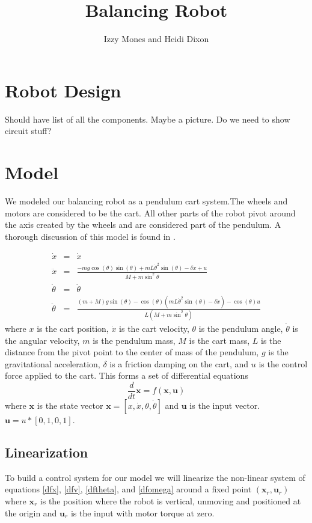 \documentclass[]{article}
\title{Balancing Robot}
\author{Izzy Mones and Heidi Dixon}
\newcommand{\bx}{\boldsymbol{x}}
\newcommand{\bu}{\boldsymbol{u}}
\begin{document}
	\maketitle

\section*{Robot Design}
Should have list of all the components. Maybe a picture. Do we need to show circuit stuff?

\section*{Model}
We modeled our balancing robot as a pendulum cart system.The wheels and motors are considered to be the cart.  All other parts of the robot pivot around the axis created by the wheels and are considered part of the pendulum.  A thorough discussion of this model is found in \cite{brunton}.

\begin{eqnarray}
	\dot{x} & = & \dot{x} \label{dfx} \\ 
	\ddot{x}          & = & \frac{-mg \cos(\theta)\sin(\theta) + mL{\dot{\theta}}^2 \sin(\theta)-\delta \dot{x}+u }{M+m\sin^2\theta}  \label{dfv} \\
	\dot{\theta}  &= & \dot{\theta} \label{dftheta} \\	
	\ddot{\theta}  &= & \frac{(m+M)g\sin(\theta)-\cos(\theta)(mL{\dot{\theta}}^2\sin(\theta)-\delta \dot{x})-\cos(\theta)u}{L(M+m\sin^2\theta)} \label{dfomega}
\end{eqnarray}
where $x$ is the cart position, $\dot{x}$ is the cart velocity, $\theta$ is the pendulum angle, $\dot{\theta}$ is the angular velocity, $m$ is the pendulum mass, $M$ is the cart mass, $L$ is the distance from the pivot point to the center of mass of the pendulum, $g$ is the gravitational acceleration, $\delta$ is a friction damping on the cart, and $u$ is the control force applied to the cart. This forms a set of differential equations 
\begin{equation}
	\frac{d}{dt} \bx = f(\bx, \bu) \label{dfdx}
\end{equation}
where $\bx$ is the state vector $\bx = [x, \dot{x}, \theta, \dot{\theta}]$ and $\bu$ is the input vector.$\bu=u *[ 0, 1, 0, 1]$.

\subsection*{Linearization}
To build a control system for our model we will linearize the non-linear system of equations \eqref{dfx}, \eqref{dfv}, \eqref{dftheta}, and \eqref{dfomega} around a fixed point $(\bx_r, \bu_r)$  where $\bx_r$ is the position where the robot is vertical, unmoving and positioned at the origin and $\bu_r$ is the input with motor torque at zero.
\end{document}
